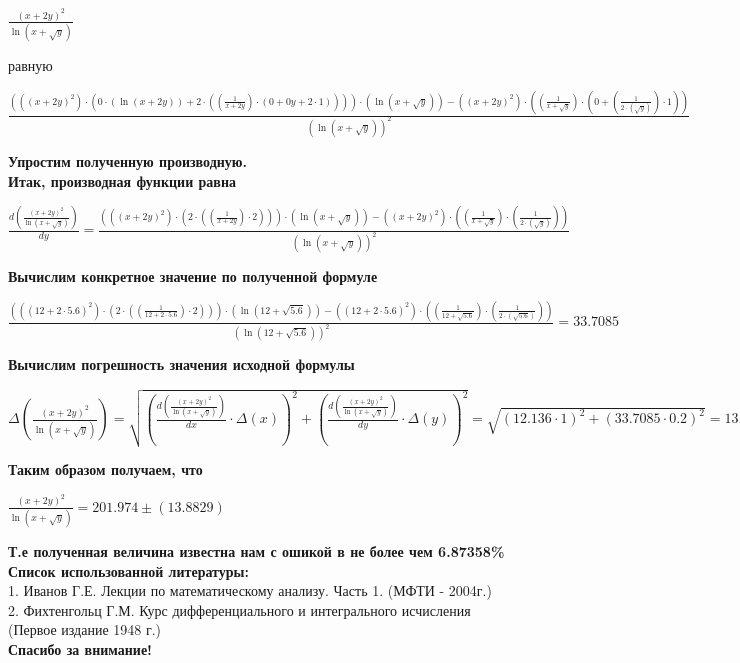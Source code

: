 \documentclass{article}
\theoremstyle{definition}
\begin{document}
\begin{center}$\frac{(x + 2y) ^ 2}{ \ln (x +  \sqrt {y})}$ \end{center}равную
\begin{center}$\frac{(((x + 2y) ^ 2) \cdot (0 \cdot ( \ln (x + 2y)) + 2 \cdot ((\frac{1}{x + 2y}) \cdot (0 + 0y + 2 \cdot 1)))) \cdot ( \ln (x +  \sqrt {y})) - ((x + 2y) ^ 2) \cdot ((\frac{1}{x +  \sqrt {y}}) \cdot (0 + (\frac{1}{2 \cdot ( \sqrt {y})}) \cdot 1))}{( \ln (x +  \sqrt {y}))^ 2}$ \end{center}{\LARGE \bfseries \center Упростим полученную производную. \\}{\LARGE \bfseries \center Итак, производная функции равна \\}\begin{center}$\frac{d(\frac{(x + 2y) ^ 2}{ \ln (x +  \sqrt {y})})}{dy} = \frac{(((x + 2y) ^ 2) \cdot (2 \cdot ((\frac{1}{x + 2y}) \cdot 2))) \cdot ( \ln (x +  \sqrt {y})) - ((x + 2y) ^ 2) \cdot ((\frac{1}{x +  \sqrt {y}}) \cdot (\frac{1}{2 \cdot ( \sqrt {y})}))}{( \ln (x +  \sqrt {y}))^ 2}$ \end{center}{\LARGE \bfseries \center Вычислим конкретное значение по полученной формуле \\}\begin{center}$\frac{(((12 + 2 \cdot 5.6) ^ 2) \cdot (2 \cdot ((\frac{1}{12 + 2 \cdot 5.6}) \cdot 2))) \cdot ( \ln (12 +  \sqrt {5.6})) - ((12 + 2 \cdot 5.6) ^ 2) \cdot ((\frac{1}{12 +  \sqrt {5.6}}) \cdot (\frac{1}{2 \cdot ( \sqrt {5.6})}))}{( \ln (12 +  \sqrt {5.6}))^ 2} = 33.7085$ \end{center}{\LARGE \bfseries \center Вычислим погрешность значения исходной формулы \\}\begin{center}$\Delta(\frac{(x + 2y) ^ 2}{ \ln (x +  \sqrt {y})}) = \sqrt{(\frac{d(\frac{(x + 2y) ^ 2}{ \ln (x +  \sqrt {y})})}{dx} \cdot \Delta(x)) ^ {2} + (\frac{d(\frac{(x + 2y) ^ 2}{ \ln (x +  \sqrt {y})})}{dy} \cdot \Delta(y)) ^ {2}} = \sqrt{(12.136 \cdot 1)^2 + (33.7085 \cdot 0.2)^2} = 13.8829$ \end{center}{\LARGE \bfseries \center Таким образом получаем, что \\}\begin{center}$\frac{(x + 2y) ^ 2}{ \ln (x +  \sqrt {y})} = 201.974 \pm (13.8829)$\end{center}{\large \bfseries \center Т.е полученная величина известна нам с ошикой в не более чем 6.87358\%\\}{\LARGE \bfseries \center Список использованной литературы:\\}1. Иванов Г.Е. Лекции по математическому анализу. Часть 1. (МФТИ - 2004г.)\\
2. Фихтенгольц Г.М. Курс дифференциального и интегрального исчисления (Первое издание 1948 г.)\\
{\LARGE \bfseries \center Спасибо за внимание!\\}
\end{document}
